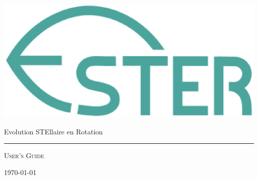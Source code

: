 \begin{titlepage}

\ 

\vspace{2cm}


\hspace*{-3.5cm}
\includegraphics[width=0.90\linewidth,angle=0]{fig/ester_logo.eps}

\vspace{0.2cm}

\hspace{2pt}  {\LARGE \textsf{E}volution \textsf{STE}llaire en \textsf{R}otation}

{\color{darkred} \rule{\textwidth}{2pt}}

\vspace{2cm}

\begin{center}
{\fontsize{42}{42}\selectfont \textsc{User's Guide}}
\end{center}

\vfill

\hfill{\Large\today}

\end{titlepage}


